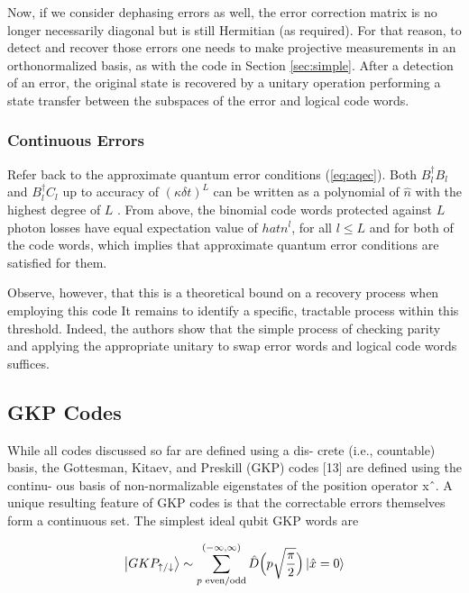 \documentclass[12]{amsart}
\newcommand\0{\mathbf{0}}
\newcommand\<{\langle}
\renewcommand\>{\rangle}
\begin{document}
Now, if we consider dephasing errors as well, the error correction matrix is no longer necessarily diagonal but is still Hermitian (as required). For that reason, to detect and recover those errors one needs to make projective measurements in an orthonormalized basis, as with the code in Section \ref{sec:simple}. After a detection of an error, the original state is recovered by a unitary operation performing a state transfer between the subspaces of the error and logical code words.

\subsubsection{Continuous Errors}

Refer back to the approximate quantum error conditions (\ref{eq:aqec}). Both $B_l^\dag B_l$ and $B_l^\dag C_l$ up to accuracy of $(\kappa \delta t)^L$ can be written as a polynomial of $\hat{n}$ with the highest degree of $L$ \cite{michael2016new}. From above, the binomial code words protected against $L$ photon losses have equal expectation value of $hat{n}^l$, for all $l \leq L$ and for both of the code words, which implies that approximate quantum error conditions are satisfied for them.

Observe, however, that this is a theoretical bound on a recovery process when employing this code It remains to identify a specific, tractable process within this threshold. Indeed, the authors show that the simple process of checking parity and applying the appropriate unitary to swap error words and logical code words suffices.
\subsection{GKP Codes}

While all codes discussed so far are defined using a dis- crete (i.e., countable) basis, the Gottesman, Kitaev, and Preskill (GKP) codes [13] are defined using the continu- ous basis of non-normalizable eigenstates of the position operator xˆ. A unique resulting feature of GKP codes is that the correctable errors themselves form a continuous set. The simplest ideal qubit GKP words are

\begin{align*}
\ket{GKP_{\uparrow/\downarrow}} \sim \sum_{p\text{ even/odd}}^{(-\infty, \infty)} \hat{D}\Big(p \sqrt{\frac{\pi}{2}} \Big) \ket{\hat{x} = 0} 	
\end{align*}
\end{document}
